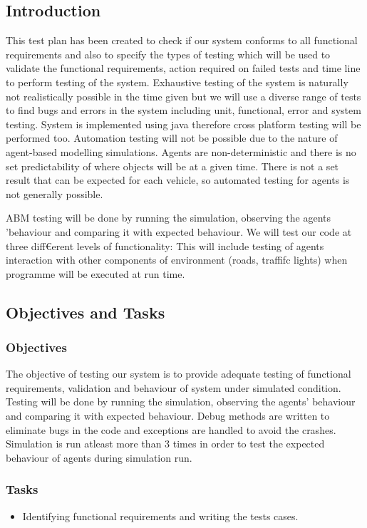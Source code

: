 \documentclass[11pt]{article}
\begin{document}
\begin{enumerate}
\subsection{Introduction}
This test plan has been created to check if our system conforms to all functional requirements and also to specify the types of testing which will be used to validate the functional requirements, action required on failed tests and time line to perform testing of the system. Exhaustive testing of the system is naturally not realistically possible in the time given but we will use a diverse range of tests to find bugs and errors in the system including unit, functional, error and system testing. System is implemented using java therefore cross platform testing will be performed too. Automation testing will not be possible due to the nature of agent-based modelling simulations. Agents are non-deterministic and there is no set predictability of where objects will be at a given time. There is not a set result that can be expected for each vehicle, so automated testing for agents is not generally possible. 

ABM testing will be done by running the simulation, observing the agents \textquoteright behaviour and comparing it with expected behaviour. We will test our code at three diff€erent levels of functionality:
This will include testing of agents interaction with other components of environment (roads, traffiƒc lights) when programme will be executed at run time.

\subsection{Objectives and Tasks}
\subsubsection{Objectives}
The objective of testing our system is to provide adequate testing of functional requirements, validation and behaviour of system under simulated condition. Testing will be done by running the simulation, observing the agents' behaviour and comparing it with expected behaviour. Debug methods are written to eliminate bugs in the code and exceptions are handled to avoid the crashes. Simulation is run atleast more than 3 times in order to test the expected behaviour of agents during simulation run.

\subsubsection{Tasks}
\begin{itemize}
\item Identifying functional requirements and writing the tests cases.


\end{itemize}
\end{enumerate}
\end{document}
